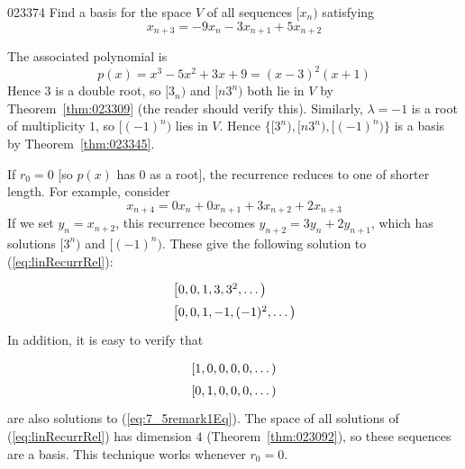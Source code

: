 \begin{example}{}{023374}
Find a basis for the space $V$ of all sequences $[x_{n})$ satisfying
\begin{equation*}
x_{n+3} = -9x_n - 3x_{n+1} + 5x_{n+2}
\end{equation*}
\vspace*{-2em}
\begin{solution}
 The associated polynomial is
\begin{equation*}
p(x) = x^3 - 5x^2 + 3x + 9 = (x - 3)^2(x + 1)
\end{equation*}
Hence $3$ is a double root, so $[3_{n})$ and $[n3^{n})$ both lie in $V$ by Theorem~\ref{thm:023309} (the reader should verify this). Similarly, $\lambda = -1$ is a root of multiplicity $1$, so $[(-1)^{n})$ lies in $V$. Hence $\{[3^{n}), [n3^{n}), [(-1)^{n})\}$ is a basis by Theorem~\ref{thm:023345}.
\end{solution}
\end{example}

\vspace{1em}

\noindent If $r_{0} = 0$ [so $p(x)$ has $0$ as a root], the recurrence reduces to one of shorter length. For example, consider
\begin{equation}\label{eq:7_5remark1Eq}
x_{n+4} = 0x_n + 0x_{n+1} + 3x_{n+2} + 2x_{n+3}
\end{equation}
If we set $y_{n} = x_{n+2}$, this recurrence becomes $y_{n+2} = 3y_{n} + 2y_{n+1}$, which has solutions $[3^{n})$ and $[(-1)^{n})$. These give the following solution to (\ref{eq:linRecurrRel}):
\begin{equation*}
\def\arraystretch{1.5}
\begin{array}{l}
\left[0, 0, 1, 3, 3^2, \dots\right) \\
\left[0, 0, 1, -1, (-1)^2, \dots\right)
\end{array}
\end{equation*}
In addition, it is easy to verify that
\begin{equation*}
\def\arraystretch{1.5}
\begin{array}{l}
\left[1, 0, 0, 0, 0, \dots\right) \\
\left[0, 1, 0, 0, 0, \dots\right)
\end{array}
\end{equation*}
are also solutions to (\ref{eq:7_5remark1Eq}). The space of all solutions of (\ref{eq:linRecurrRel}) has dimension $4$ (Theorem~\ref{thm:023092}), so these sequences are a basis. This technique works whenever $r_{0} = 0$.

